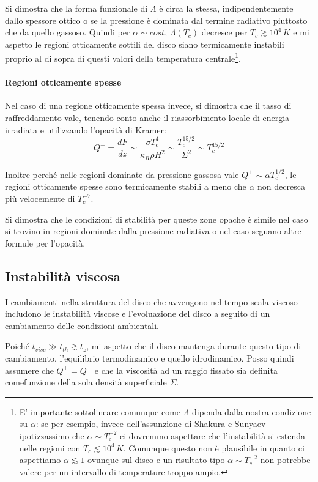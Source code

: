 \documentclass[a4paperbi]{article}
\begin{document}
	Si dimostra che la forma funzionale di $\Lambda$ è circa la stessa, indipendentemente dallo spessore ottico o se la pressione è dominata dal termine radiativo piuttosto che da quello gassoso. Quindi per $\alpha\sim cost$, $\Lambda(T_c)$ decresce per $T_c\gtrsim10^4\,K$ e mi aspetto le regioni otticamente sottili del disco siano termicamente instabili proprio al di sopra di questi valori della temperatura centrale\footnote{E' importante sottolineare comunque come $\Lambda$ dipenda dalla nostra condizione su $\alpha$: se per esempio, invece dell'assunzione di Shakura e Sunyaev ipotizzassimo che $\alpha\sim T^{-2}_c$ ci dovremmo aspettare che l'instabilità si estenda nelle regioni con $T_c\lesssim10^4\,K$. Comunque questo non è plausibile in quanto ci aspettiamo $\alpha\lesssim1$ ovunque sul disco e un risultato tipo $\alpha\sim T^{-2}_c$ non potrebbe valere per un intervallo di temperature troppo ampio.}.
		
	\paragraph{Regioni otticamente spesse}
	Nel caso di una regione otticamente spessa invece, si dimostra che il tasso di raffreddamento vale, tenendo conto anche il riassorbimento locale di energia irradiata e utilizzando l'opacità di Kramer:
	\begin{equation}
		Q^-=\frac{dF}{dz}\sim\frac{\sigma T_c^4}{\kappa_R\rho H^2}\sim\frac{T_c^{15/2}}{\Sigma^2}\sim T_c^{15/2}
	\end{equation}
	
	Inoltre perché nelle regioni dominate da pressione gassosa vale $Q^+\sim \alpha T_c^{1/2}$, le regioni otticamente spesse sono termicamente stabili a meno che $\alpha$ non decresca più velocemente di $T_c^{-7}$.
	
	Si dimostra che le condizioni di stabilità per queste zone opache è simile nel caso si trovino in regioni dominate dalla pressione radiativa o nel caso seguano altre formule per l'opacità.

\subsection{Instabilità viscosa}
	I cambiamenti nella struttura del disco che avvengono nel tempo scala viscoso includono le instabilità viscose e l'evoluazione del disco a seguito di un cambiamento delle condizioni ambientali.
	
	Poiché $t_{visc}\gg t_{th}\gtrsim t_z$, mi aspetto che il disco mantenga durante questo tipo di cambiamento, l'equilibrio termodinamico e quello idrodinamico. Posso quindi assumere che $Q^+=Q^-$ e che la viscosità ad un raggio fissato sia definita comefunzione della sola densità superficiale $\Sigma$. 
	
\end{document}

